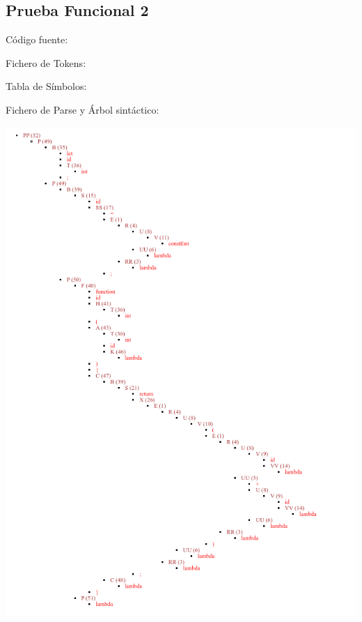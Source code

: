 \documentclass{article}[a4paper]
\begin{document}
\begin{appendices}
\subsection{Prueba Funcional 2}
Código fuente:

\hspace{\parindent} Fichero de Tokens:

\hspace{\parindent} Tabla de Símbolos:

\hspace{\parindent} Fichero de Parse y Árbol sintáctico:

\includegraphics[width=1\textwidth]{arbol2.png}


\end{appendices}
\end{document}
